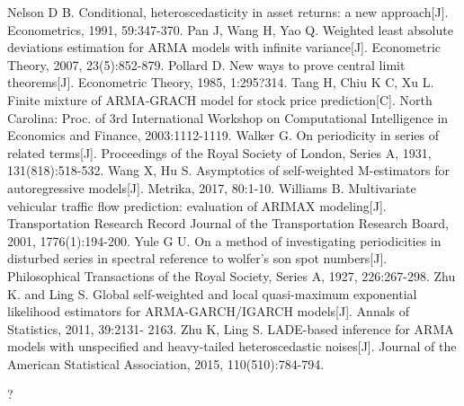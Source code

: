 \documentclass[a4paper,12pt,openany,oneside,utf-8]{ctexbook}
\newcommand{\sanhao}{\fontsize{15.75pt}{\baselineskip}\selectfont}
\begin{document}
\begin{spacing}{1.2}
\begin{thebibliography}{99}
{				 Nelson D B. Conditional, heteroscedasticity in asset returns: a new approach[J]. Econometrics, 1991, 59:347-370.
				 Pan J, Wang H, Yao Q. Weighted least absolute deviations estimation for ARMA models with infinite variance[J]. Econometric Theory, 2007, 23(5):852-879.
				 Pollard D. New ways to prove central limit theorems[J]. Econometric Theory, 1985, 1:295?314.
				 Tang H, Chiu K C, Xu L. Finite mixture of ARMA-GRACH model for stock price prediction[C]. North Carolina: Proc. of 3rd International Workshop on Computational Intelligence in Economics and Finance, 2003:1112-1119.
				 Walker G. On periodicity in series of related terms[J]. Proceedings of the Royal Society of London, Series A, 1931, 131(818):518-532.
				 Wang X, Hu S. Asymptotics of self-weighted M-estimators for autoregressive models[J]. Metrika, 2017, 80:1-10.
				 Williams B. Multivariate vehicular traffic flow prediction: evaluation of  ARIMAX modeling[J]. Transportation Research Record Journal of the Transportation Research Board, 2001, 1776(1):194-200.
				 Yule G U. On a method of investigating periodicities in disturbed series in spectral reference to wolfer's son spot numbers[J]. Philosophical Transactions of the Royal Society, Series A, 1927, 226:267-298.
				 Zhu K. and Ling S. Global self-weighted and local quasi-maximum exponential likelihood estimators for ARMA-GARCH/IGARCH models[J]. Annals of Statistics, 2011, 39:2131- 2163.
				 Zhu K, Ling S. LADE-based inference for ARMA models with unspecified and heavy-tailed heteroscedastic noises[J]. Journal of the American Statistical Association, 2015, 110(510):784-794.}
		\end{thebibliography}
	\end{spacing}
	
	?
	
	
	
	
	
	
	
	
	
	
	
	
\end{document}
